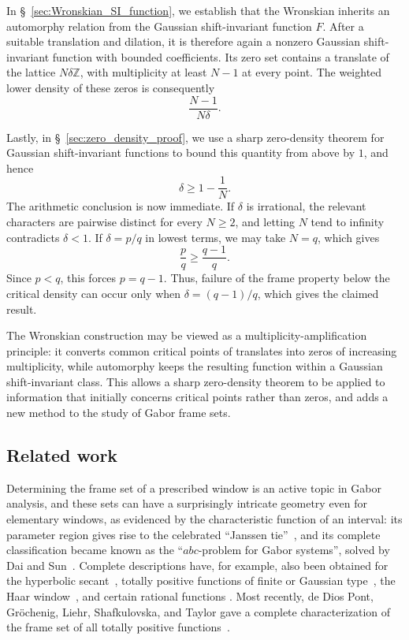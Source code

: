 \documentclass[11pt]{amsart}
\numberwithin{equation}{section}
\theoremstyle{definition}
\theoremstyle{remark}
\newcommand{\Z}{\mathbb Z}
\begin{document}
In \S~\ref{sec:Wronskian_SI_function}, we establish that the Wronskian inherits an automorphy relation from the Gaussian shift-invariant function $F$. After a suitable translation and dilation, it is therefore again a nonzero Gaussian shift-invariant function with bounded coefficients. Its zero set contains a translate of the lattice $N\delta\Z$, with multiplicity at least $N-1$ at every point. The weighted lower density of these zeros is consequently
\begin{equation}
    \frac{N-1}{N\delta}.
\end{equation}

Lastly, in \S~\ref{sec:zero_density_proof}, we use a sharp zero-density theorem for Gaussian shift-invariant functions to bound this quantity from above by $1$, and hence
\begin{equation}
    \delta\geq 1-\frac1N.
\end{equation}
The arithmetic conclusion is now immediate. If $\delta$ is irrational, the relevant characters are pairwise distinct for every $N\geq2$, and letting $N$ tend to infinity contradicts $\delta<1$. If $\delta=p/q$ in lowest terms, we may take $N=q$, which gives
\begin{equation}
    \frac pq\geq\frac{q-1}{q}.
\end{equation} Since $p<q$, this forces $p=q-1$. Thus, failure of the frame property below the critical density can occur only when $\delta=(q-1)/q$, which gives the claimed result.

The Wronskian construction may be viewed as a multiplicity-amplification principle: it converts common critical points of translates into zeros of increasing multiplicity, while automorphy keeps the resulting function within a Gaussian shift-invariant class. This allows a sharp zero-density theorem to be applied to information that initially concerns critical points rather than zeros, and adds a new method to the study of Gabor frame sets.

\subsection{Related work}
\label{subsec:related-work-priority}

Determining the frame set of a prescribed window is an active topic in Gabor analysis, and these sets can have a surprisingly intricate geometry even for elementary windows, as evidenced by the characteristic function of an interval: its parameter region gives rise to the celebrated ``Janssen tie''~\cite{JanssenTie}, and its complete classification became known as the ``$abc$-problem for Gabor systems'', solved by Dai and Sun~\cite{DaiSunABC}. Complete descriptions have, for example, also been obtained for the hyperbolic secant~\cite{JanssenStrohmer2002}, totally positive functions of finite or Gaussian type~\cite{GRSsampling,GroechenigStoeckler2013}, the Haar window~\cite{DaiZhu2024}, and certain rational functions \cite{BelKulLyu23}. Most recently, de Dios Pont, Gr\"ochenig, Liehr, Shafkulovska, and Taylor gave a complete characterization of the frame set of all totally positive functions~\cite{DiosPontEtAl2026}.
\end{document}
